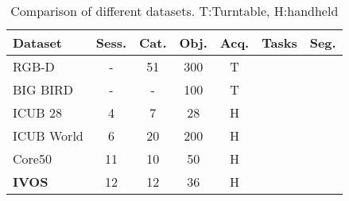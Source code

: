 \documentclass[letterpaper, 10 pt, conference]{ieeeconf}
\begin{document}
\newcommand{\xmark}{\ding{55}}\newcommand{\cmark}{\ding{51}}
\begin{table}[]
\centering
\caption{Comparison of different datasets. T:Turntable, H:handheld}
\label{table:datasets}
\begin{tabular}{|l|c|c|c|c|c|c|}
\hline
Dataset  & Sess. & Cat. & Obj. & Acq. & Tasks & Seg. \\\hline
RGB-D \cite{schwarz2015rgb} & - & 51 & 300 & T & \xmark & \xmark \\
BIG BIRD \cite{singh2014bigbird} & - & - & 100 & T & \xmark & \xmark \\
ICUB 28 \cite{pasquale2015teaching} & 4 & 7 & 28 & H & \xmark & \xmark \\
ICUB World \cite{pasquale2016object} & 6 & 20 & 200 & H & \xmark & \xmark \\
Core50 \cite{lomonaco2017core50} & 11 & 10 & 50 & H & \xmark & \xmark \\\hline
\textbf{IVOS} & 12 & 12 & 36 & H & \textbf{\cmark} & \textbf{\cmark}\\\hline
\end{tabular}
\end{table} 
\end{document}
